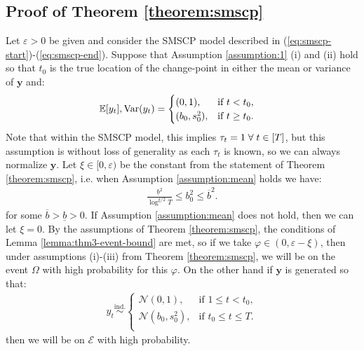 \subsection{Proof of Theorem \ref{theorem:smscp}}
\label{app:localization-smscp}

Let $\varepsilon > 0$ be given and consider the SMSCP model described in (\ref{eq:smscp-start})-(\ref{eq:smscp-end}). Suppose that Assumption \ref{assumption:1} (i) and (ii) hold so that $t_0$ is the true location of the change-point in either the mean or variance of $\mathbf{y}$ and:
\begin{align*}
    \mathbb{E}[y_t], \text{\normalfont Var}(y_t) &= 
    \begin{cases}
        (0,1), & \text{if } t < t_0, \\
        (b_0,s_0^2), & \text{if } t \geq t_0.
    \end{cases} 
\end{align*}
Note that within the SMSCP model, this implies $\tau_t = 1 \;\forall\; t \in [T]$, but this assumption is without loss of generality as each $\tau_t$ is known, so we can always normalize $\mathbf{y}$. Let $\xi \in [0,\varepsilon)$ be the constant from the statement of Theorem \ref{theorem:smscp}, i.e. when Assumption \ref{assumption:mean} holds we have:
\begin{align}\label{eq:thm3-b_0-bd}
     \frac{\underline{b}^2}{\log^{\xi/2} T} \leq b^2_0 \leq \overline{b}^2.
\end{align}
for some $\overline{b} > \underline{b} > 0$. If Assumption \ref{assumption:mean} does not hold, then we can let $\xi = 0$. By the assumptions of Theorem \ref{theorem:smscp}, the conditions of Lemma \ref{lemma:thm3-event-bound} are met, so if we take $\varphi \in (0,\varepsilon - \xi)$, then under assumptions (i)-(iii) from Theorem \ref{theorem:smscp}, we will be on the event $\Omega$ with high probability for this $\varphi$. On the other hand if $\mathbf{y}$ is generated so that:
\begin{align*}
    y_t \overset{\text{ind.}}{\sim}
    \begin{cases}
        \mathcal{N}(0,1), &\text{if } 1 \leq t < t_0, \\
        \mathcal{N}(b_0,s_0^2), &\text{if } t_0 \leq t \leq T. \\
    \end{cases}
\end{align*}
then we will be on $\mathcal{E}$ with high probability.

